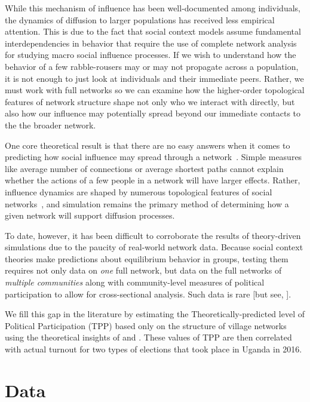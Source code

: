 \documentclass[12pt]{article}
\begin{document}
While this mechanism of influence has been well-documented among individuals, the dynamics of diffusion to larger populations has received less empirical attention. This is due to the fact that social context models assume fundamental interdependencies in behavior that require the use of complete network analysis for studying macro social influence processes. If we wish to understand how the behavior of a few rabble-rousers may or may not propagate across a population, it is not enough to just look at individuals and their immediate peers. Rather, we must work with full networks so we can examine how the higher-order topological features of network structure shape not only who we interact with directly, but also how our influence may potentially spread beyond our immediate contacts to the the broader network.

One core theoretical result is that there are no easy answers when it comes to predicting how social influence may spread through a network~\citep{centola2007complex,jackson2010diffusion}. Simple measures like average number of connections or average shortest paths cannot explain whether the actions of a few people in a network will have larger effects. Rather, influence dynamics are shaped by numerous topological features of social networks~\citep{centola2015social}, and simulation remains the primary method of determining how a given network will support diffusion processes.

To date, however, it has been difficult to corroborate the results of theory-driven simulations due to the paucity of real-world network data. Because social context theories make predictions about equilibrium behavior in groups, testing them requires not only data on \emph{one} full network, but data on the full networks of \emph{multiple communities} along with community-level measures of political participation to allow for cross-sectional analysis. Such data is rare [but see, \citet{cruz2017politician}]. 

We fill this gap in the literature by estimating the Theoretically-predicted level of Political Participation (TPP) based only on the structure of village networks using the theoretical insights of \cite{Siegel:2009vi} and \cite{Rolfe:2012ka}. These values of TPP are then correlated with actual turnout for two types of elections that took place in Uganda in 2016.


\section{Data}\label{section_data}
\end{document}

